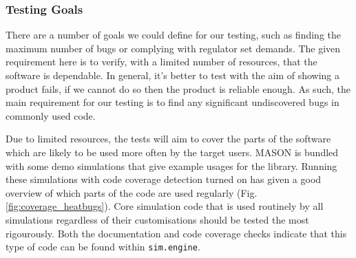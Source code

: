 \documentclass[11pt]{article}
\begin{document}


\subsubsection{Testing Goals}

There are a number of goals we could define for our testing, such as finding the maximum number of bugs or complying with regulator set demands.
The given requirement here is to verify, with a limited number of resources, that the software is dependable.
In general, it's better to test with the aim of showing a product fails, if we cannot do so then the product is reliable enough\cite[pp. 20]{lessons_book}.
As such, the main requirement for our testing is to find any significant undiscovered bugs in commonly used code.


Due to limited resources, the tests will aim to cover the parts of the software which are likely to be used more often by the target users.
MASON is bundled with some demo simulations that give example usages for the library.
Running these simulations with code coverage detection turned on has given a good overview of which parts of the code are used regularly (Fig. \ref{fig:coverage_heatbugs}).
Core simulation code that is used routinely by all simulations regardless of their customisations should be tested the most rigourously.
Both the documentation\cite[pp.85]{mason_doc} and code coverage checks indicate that this type of code can be found within \texttt{sim.engine}.
\end{document}
